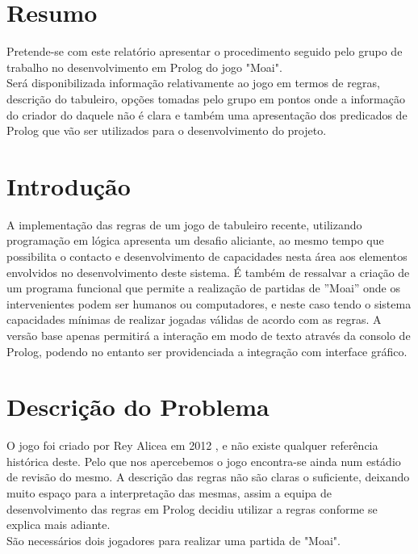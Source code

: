 \documentclass[15pt,a4paper]{article}
\begin{document}
\newpage

\section*{Resumo}
Pretende-se com este relatório apresentar o procedimento seguido pelo grupo de trabalho no desenvolvimento em Prolog do jogo "Moai".
\\
Será disponibilizada informação relativamente ao jogo em termos de regras, descrição do tabuleiro, opções tomadas pelo grupo em pontos onde a informação do criador do daquele não é clara e também uma apresentação dos predicados de Prolog que vão ser utilizados para o desenvolvimento do projeto.

\newpage

\tableofcontents



\newpage

\section{Introdução}
A implementação das regras de um jogo de tabuleiro recente, utilizando programação em lógica apresenta um desafio aliciante, ao mesmo tempo que possibilita o contacto e desenvolvimento de capacidades nesta área aos elementos envolvidos no desenvolvimento deste sistema. É também de ressalvar a criação de um programa funcional que permite a realização de partidas de ''Moai'' onde os intervenientes podem ser humanos ou computadores, e neste caso tendo o sistema capacidades mínimas de realizar jogadas válidas de acordo com as regras. A versão base apenas permitirá a interação em modo de texto através da consolo de Prolog, podendo no entanto ser providenciada a integração com interface gráfico.


\section{Descrição do Problema}
O jogo foi criado por Rey Alicea em 2012 \cite{gamegeek}, e não existe qualquer referência histórica deste. Pelo que nos apercebemos o jogo encontra-se ainda num estádio de revisão do mesmo. A descrição das regras \cite{blog, gamegeek} não são claras o suficiente, deixando muito espaço para a interpretação das mesmas, assim a equipa de desenvolvimento das regras em Prolog decidiu utilizar a regras conforme se explica mais adiante.
\\
São necessários dois jogadores para realizar uma partida de "Moai".
\end{document}
